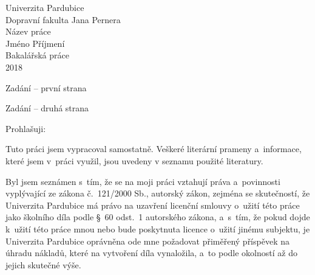 \documentclass[12pt,a4paper]{report}															%
\begin{document}

\begin{center}
{
\fontsize{14pt}{21pt}\selectfont																%
Univerzita Pardubice \\																			%
\vspace{10pt}																					%
Dopravní fakulta Jana Pernera \\																%
\vspace{250pt}																					%
\fontsize{14pt}{21pt}\selectfont																%
Název práce \\																					%
\vspace{10pt}																					%
\fontsize{14pt}{21pt}\selectfont																%
Jméno Příjmení \\																				%
\vspace{250pt}																					%
Bakalářská práce \\																				%
\vspace{10pt}																					%
2018																							%
}
\end{center}
\thispagestyle{empty}
\newpage


Zadání -- první strana
\thispagestyle{empty}
\newpage

Zadání -- druhá strana
\thispagestyle{empty}
\newpage


\vspace*{100pt}																					%
Prohlašuji:

Tuto práci jsem vypracoval samostatně. Veškeré literární prameny a~informace, které jsem v~práci využil, jsou uvedeny v seznamu použité literatury.

Byl jsem seznámen s~tím, že se na moji práci vztahují práva a~povinnosti vyplývající ze zákona č.~121/2000 Sb., autorský zákon, zejména se skutečností, že Univerzita Pardubice má právo na uzavření licenční smlouvy o~užití této práce jako školního díla podle §~60 odst.~1 autorského zákona, a~s~tím, že pokud dojde k~užití této práce mnou nebo bude poskytnuta licence o~užití jinému subjektu, je Univerzita Pardubice oprávněna ode mne požadovat přiměřený příspěvek na úhradu nákladů, které na vytvoření díla vynaložila, a~to podle okolností až do jejich skutečné výše.
\end{document}
